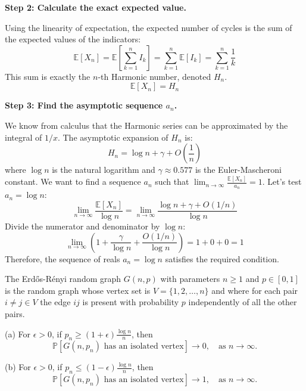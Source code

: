 \begin{solution}
\textbf{Step 2: Calculate the exact expected value.}

Using the linearity of expectation, the expected number of cycles is the sum of the expected values of the indicators:
\[ \mathbb{E}[X_n] = \mathbb{E} \left[ \sum_{k=1}^n I_k \right] = \sum_{k=1}^n \mathbb{E}[I_k] = \sum_{k=1}^n \frac{1}{k} \]
This sum is exactly the $n$-th Harmonic number, denoted $H_n$.
\[ \mathbb{E}[X_n] = H_n \]

\textbf{Step 3: Find the asymptotic sequence $a_n$.}

We know from calculus that the Harmonic series can be approximated by the integral of $1/x$. The asymptotic expansion of $H_n$ is:
\[ H_n = \log n + \gamma + O\left(\frac{1}{n}\right) \]
where $\log n$ is the natural logarithm and $\gamma \approx 0.577$ is the Euler-Mascheroni constant.
We want to find a sequence $a_n$ such that $\lim_{n \to \infty} \frac{\mathbb{E}[X_n]}{a_n} = 1$.
Let's test $a_n = \log n$:
\[ \lim_{n \to \infty} \frac{\mathbb{E}[X_n]}{\log n} = \lim_{n \to \infty} \frac{\log n + \gamma + O(1/n)}{\log n} \]
Divide the numerator and denominator by $\log n$:
\[ \lim_{n \to \infty} \left( 1 + \frac{\gamma}{\log n} + \frac{O(1/n)}{\log n} \right) = 1 + 0 + 0 = 1 \]
Therefore, the sequence of reals $a_n = \log n$ satisfies the required condition.
\end{solution}

\begin{exercise}\label{probability:2019:8}
The Erd\H{o}s-R\'enyi random graph $G(n,p)$ with parameters $n \geq 1$ and $p \in [0,1]$ is the random graph whose vertex set is $V = \{1,2,\dots,n\}$ and where for each pair $i \neq j \in V$ the edge $ij$ is present with probability $p$ independently of all the other pairs.

(a) For $\epsilon > 0$, if $p_n \geq (1+\epsilon)\frac{\log n}{n}$, then
\[
\mathbb{P}[G(n,p_n) \text{ has an isolated vertex}] \to 0, \quad \text{as } n \to \infty.
\]

(b) For $\epsilon > 0$, if $p_n \leq (1-\epsilon)\frac{\log n}{n}$, then
\[
\mathbb{P}[G(n,p_n) \text{ has an isolated vertex}] \to 1, \quad \text{as } n \to \infty.
\]
\end{exercise}

